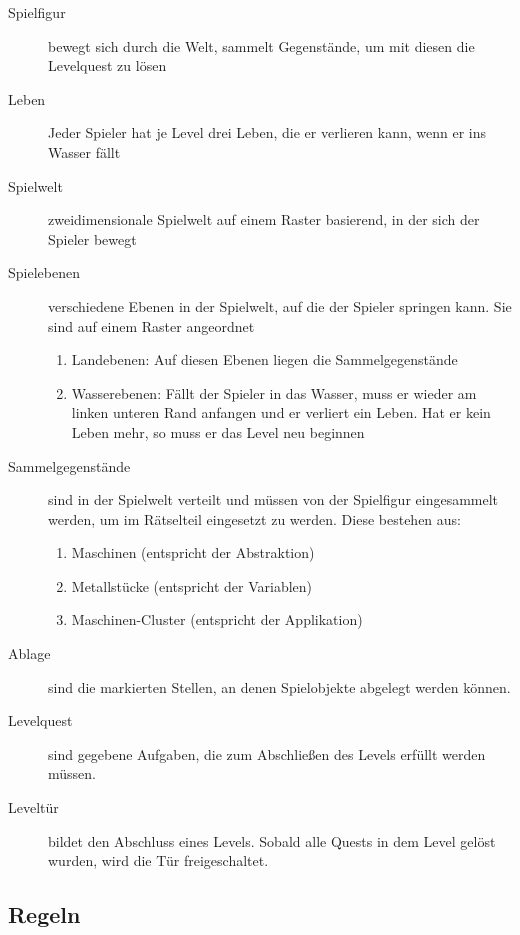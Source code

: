 \documentclass{scrartcl}
\begin{document}
\begin{description}
	\item[Spielfigur] bewegt sich durch die Welt, sammelt Gegenstände, um mit diesen die Levelquest zu lösen
	\item[Leben] Jeder Spieler hat je Level drei Leben, die er verlieren kann, wenn er ins Wasser fällt
	\item[Spielwelt] zweidimensionale Spielwelt auf einem Raster basierend, in der sich der Spieler bewegt
	\item[Spielebenen] verschiedene Ebenen in der Spielwelt, auf die der Spieler springen kann. Sie sind auf einem Raster angeordnet
		\begin{enumerate}[label=\arabic*]
			\item Landebenen: Auf diesen Ebenen liegen die Sammelgegenstände
			\item Wasserebenen: Fällt der Spieler in das Wasser, muss er wieder am linken unteren Rand anfangen und er verliert ein Leben. Hat er kein Leben mehr, so muss er das Level neu beginnen
		\end{enumerate}
	\item[Sammelgegenstände] \label{elemente:collectable}sind in der Spielwelt verteilt und müssen von der Spielfigur eingesammelt werden, um im Rätselteil eingesetzt zu werden. Diese bestehen aus:
	\begin{enumerate}[label=\arabic*]
		\item Maschinen (entspricht der Abstraktion)
		\item Metallstücke (entspricht der Variablen)
		\item Maschinen-Cluster (entspricht der Applikation)
	\end{enumerate}
	\item[Ablage] sind die markierten Stellen, an denen Spielobjekte abgelegt werden können.
	\item[Levelquest] sind gegebene Aufgaben, die zum Abschließen des Levels erfüllt werden müssen.
	\item[Leveltür] bildet den Abschluss eines Levels. Sobald alle Quests in dem Level gelöst wurden, wird die Tür freigeschaltet.
\end{description}

\subsection{Regeln}
\end{document}
